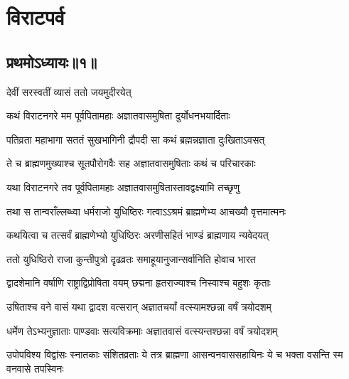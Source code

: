 \part{विराटपर्व}
\newcommand{\onelineindentedshloka}[2]{
    {#1\hspace{\shlokaspaceskip}}\\
\onelineshloka{\hspace{\shlokaspaceskip}#2}}

\chapter{प्रथमोऽध्यायः॥१॥}

{देवीं सरस्वतीं व्यासं ततो जयमुदीरयेत्}



\twolineshloka
{कथं विराटनगरे मम पूर्वपितामहाः}
{अज्ञातवासमुषिता दुर्योधनभयार्दिताः}


\twolineshloka
{पतिव्रता महाभागा सततं सुखभागिनी}
{द्रौपदी सा कथं ब्रह्मन्नज्ञाता दुःखिताऽवसत्}


\twolineshloka
{ते च ब्राह्मणमुख्याश्च सूतपौरोगवैः सह}
{अज्ञातवासमुषिताः कथं च परिचारकाः}



\twolineshloka
{यथा विराटनगरे तव पूर्वपितामहाः}
{अज्ञातवासमुषितास्तावद्वक्ष्यामि तच्छृणु}


\twolineshloka
{तथा स तान्वराँल्लब्ध्वा धर्मराजो युधिष्ठिरः}
{गत्वाऽऽश्रमं ब्राह्मणेभ्य आचख्यौ वृत्तमात्मनः}


\twolineshloka
{कथयित्वा च तत्सर्वं ब्राह्मणेभ्यो युधिष्ठिरः}
{अरणीसहितं भाण्डं ब्राह्मणाय न्यवेदयत्}


\twolineshloka
{ततो युधिष्ठिरो राजा कुन्तीपुत्रो दृढव्रतः}
{समाहूयानुजान्सर्वानिति होवाच भारत}


\twolineshloka
{द्वादशेमानि वर्षाणि राष्ट्राद्विप्रोषिता वयम्}
{छद्मना हृतराज्याश्च निस्वाश्च बहुशः कृताः}


\twolineshloka
{उषिताश्च वने वासं यथा द्वादश वत्सरान्}
{अज्ञातचर्यां वत्स्यामश्छन्ना वर्षं त्रयोदशम्}



\twolineshloka
{धर्मेण तेऽभ्यनुज्ञाताः पाण्डवाः सत्यविक्रमाः}
{अज्ञातवासं वत्स्यन्तश्छन्ना वर्षं त्रयोदशम्}


\threelineshloka
{उपोपविश्य विद्वांसः स्नातकाः संशितव्रताः}
{ये तत्र ब्राह्मणा आसन्वनवाससहायिनः}
{ये च भक्ता वसन्ति स्म वनवासे तपस्विनः}


